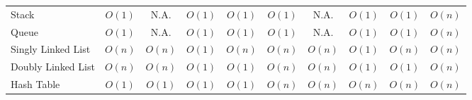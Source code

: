 \begin{table}[!htbp]
{\begin{tabular}{@{}lccccccccc@{}}
    Stack                                     & \cellcolor[HTML]{009901}$O(1)$               & \cellcolor[HTML]{656565}N.A.                 & \cellcolor[HTML]{009901}$O(1)$                  & \cellcolor[HTML]{009901}$O(1)$                 & \cellcolor[HTML]{009901}$O(1)$               & \cellcolor[HTML]{656565}N.A.                 & \cellcolor[HTML]{009901}$O(1)$                  & \cellcolor[HTML]{009901}$O(1)$                 & \cellcolor[HTML]{FFC702}$O(n)$                            \\
    Queue                                     & \cellcolor[HTML]{009901}$O(1)$               & \cellcolor[HTML]{656565}N.A.                 & \cellcolor[HTML]{009901}$O(1)$                  & \cellcolor[HTML]{009901}$O(1)$                 & \cellcolor[HTML]{009901}$O(1)$               & \cellcolor[HTML]{656565}N.A.                 & \cellcolor[HTML]{009901}$O(1)$                  & \cellcolor[HTML]{009901}$O(1)$                 & \cellcolor[HTML]{FFC702}$O(n)$                            \\
    Singly Linked List                        & \cellcolor[HTML]{FFC702}$O(n)$               & \cellcolor[HTML]{FFC702}$O(n)$               & \cellcolor[HTML]{009901}$O(1)$                  & \cellcolor[HTML]{FFC702}$O(n)$                 & \cellcolor[HTML]{FFC702}$O(n)$               & \cellcolor[HTML]{FFC702}$O(n)$               & \cellcolor[HTML]{009901}$O(1)$                  & \cellcolor[HTML]{FFC702}$O(n)$                 & \cellcolor[HTML]{FFC702}$O(n)$                            \\
    Doubly Linked List                        & \cellcolor[HTML]{FFC702}$O(n)$               & \cellcolor[HTML]{FFC702}$O(n)$               & \cellcolor[HTML]{009901}$O(1)$                  & \cellcolor[HTML]{009901}$O(1)$                 & \cellcolor[HTML]{FFC702}$O(n)$               & \cellcolor[HTML]{FFC702}$O(n)$               & \cellcolor[HTML]{009901}$O(1)$                  & \cellcolor[HTML]{009901}$O(1)$                 & \cellcolor[HTML]{FFC702}$O(n)$                            \\
    Hash Table                                & \cellcolor[HTML]{009901}$O(1)$               & \cellcolor[HTML]{009901}$O(1)$               & \cellcolor[HTML]{009901}$O(1)$                  & \cellcolor[HTML]{009901}$O(1)$                 & \cellcolor[HTML]{FFC702}$O(n)$               & \cellcolor[HTML]{FFC702}$O(n)$               & \cellcolor[HTML]{FFC702}$O(n)$                  & \cellcolor[HTML]{FFC702}$O(n)$                 & \cellcolor[HTML]{FFC702}$O(n)$                            \\

\end{tabular}}
\end{table}
